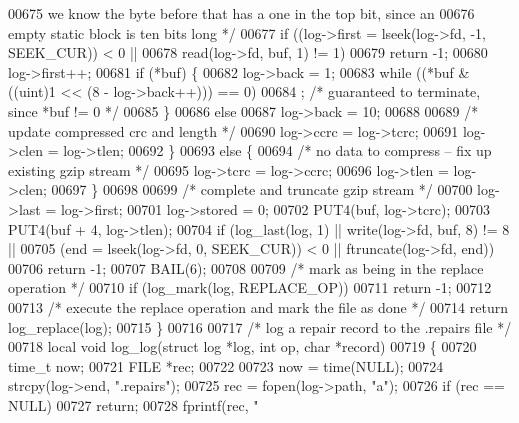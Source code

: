\begin{DoxyCode}
00675 \textcolor{comment}{           we know the byte before that has a one in the top bit, since an}
00676 \textcolor{comment}{           empty static block is ten bits long */}
00677         \textcolor{keywordflow}{if} ((log->first = lseek(log->fd, -1, SEEK\_CUR)) < 0 ||
00678             read(log->fd, buf, 1) != 1)
00679             \textcolor{keywordflow}{return} -1;
00680         log->first++;
00681         \textcolor{keywordflow}{if} (*buf) \{
00682             log->back = 1;
00683             \textcolor{keywordflow}{while} ((*buf & ((uint)1 << (8 - log->back++))) == 0)
00684                 ;       \textcolor{comment}{/* guaranteed to terminate, since *buf != 0 */}
00685         \}
00686         \textcolor{keywordflow}{else}
00687             log->back = 10;
00688 
00689         \textcolor{comment}{/* update compressed crc and length */}
00690         log->ccrc = log->tcrc;
00691         log->clen = log->tlen;
00692     \}
00693     \textcolor{keywordflow}{else} \{
00694         \textcolor{comment}{/* no data to compress -- fix up existing gzip stream */}
00695         log->tcrc = log->ccrc;
00696         log->tlen = log->clen;
00697     \}
00698 
00699     \textcolor{comment}{/* complete and truncate gzip stream */}
00700     log->last = log->first;
00701     log->stored = 0;
00702     PUT4(buf, log->tcrc);
00703     PUT4(buf + 4, log->tlen);
00704     \textcolor{keywordflow}{if} (log\_last(log, 1) || write(log->fd, buf, 8) != 8 ||
00705         (end = lseek(log->fd, 0, SEEK\_CUR)) < 0 || ftruncate(log->fd, end))
00706         \textcolor{keywordflow}{return} -1;
00707     BAIL(6);
00708 
00709     \textcolor{comment}{/* mark as being in the replace operation */}
00710     \textcolor{keywordflow}{if} (log\_mark(log, REPLACE\_OP))
00711         \textcolor{keywordflow}{return} -1;
00712 
00713     \textcolor{comment}{/* execute the replace operation and mark the file as done */}
00714     \textcolor{keywordflow}{return} log\_replace(log);
00715 \}
00716 
00717 \textcolor{comment}{/* log a repair record to the .repairs file */}
00718 local \textcolor{keywordtype}{void} log\_log(\textcolor{keyword}{struct} log *log, \textcolor{keywordtype}{int} op, \textcolor{keywordtype}{char} *record)
00719 \{
00720     time\_t now;
00721     FILE *rec;
00722 
00723     now = time(NULL);
00724     strcpy(log->end, \textcolor{stringliteral}{".repairs"});
00725     rec = fopen(log->path, \textcolor{stringliteral}{"a"});
00726     \textcolor{keywordflow}{if} (rec == NULL)
00727         \textcolor{keywordflow}{return};
00728     fprintf(rec, \textcolor{stringliteral}{"%
}
\end{DoxyCode}
